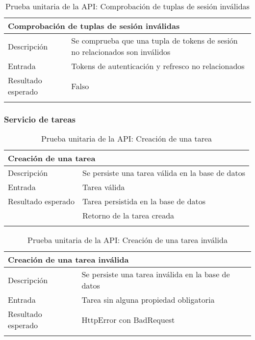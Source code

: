 \begin{longtable}{|p{} p{}|}
    \hline
    \multicolumn{2}{|l|}{\textbf{Comprobación de tuplas de sesión inválidas}} \\ \hline 
    Descripción                 & Se comprueba que una tupla de tokens de sesión no relacionados son inválidos \\ \hline
    Entrada                     & Tokens de autenticación y refresco no relacionados \\ \hline
    Resultado esperado          & Falso \\ \hline
    \caption{Prueba unitaria de la API: Comprobación de tuplas de sesión inválidas}
    \label{cp:u:api:comprobar_tupla_invalida}
\end{longtable}

\vspace{-20pt}
\subsubsection{Servicio de tareas}

\begin{longtable}{|p{} p{}|}
    \hline
    \multicolumn{2}{|l|}{\textbf{Creación de una tarea}} \\ \hline 
    Descripción                 & Se persiste una tarea válida en la base de datos \\ \hline
    Entrada                     & Tarea válida \\ \hline
    Resultado esperado          & Tarea persistida en la base de datos \\
                                & Retorno de la tarea creada \\ \hline
    \caption{Prueba unitaria de la API: Creación de una tarea}
    \label{cp:u:api:crear_tarea}
\end{longtable}

\begin{longtable}{|p{} p{}|}
    \hline
    \multicolumn{2}{|l|}{\textbf{Creación de una tarea inválida}} \\ \hline 
    Descripción                 & Se persiste una tarea inválida en la base de datos \\ \hline
    Entrada                     & Tarea sin alguna propiedad obligatoria \\ \hline
    Resultado esperado          & HttpError con BadRequest \\ \hline
    \caption{Prueba unitaria de la API: Creación de una tarea inválida}
    \label{cp:u:api:crear_tarea_invalida}
\end{longtable}

